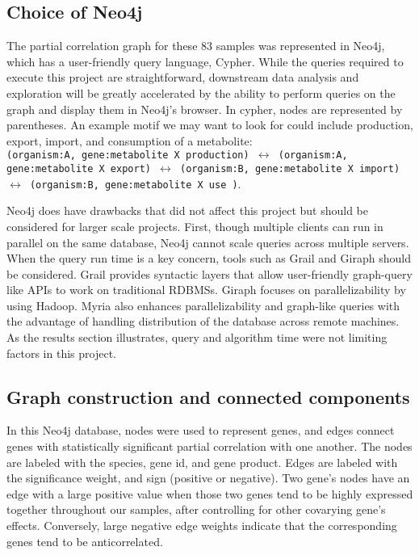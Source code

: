 \documentclass[12pt]{article}
\begin{document}
\subsection{Choice of Neo4j}

The partial correlation graph for these 83 samples was represented in Neo4j, which has a user-friendly query language, Cypher. %
While the queries required to execute this project are straightforward, downstream data analysis and exploration will be greatly accelerated by the ability to perform queries on the graph and display them in Neo4j's browser. 
In cypher, nodes are represented by parentheses.  
An example motif we may want to look for could include production, export, import, and consumption of a metabolite: \hfill \\
\texttt{(organism:A, gene:metabolite X production) $\leftrightarrow$ (organism:A, gene:metabolite X export) $\leftrightarrow$ (organism:B, gene:metabolite X import) $\leftrightarrow$ (organism:B, gene:metabolite X use )}.  

Neo4j does have drawbacks that did not affect this project but should be considered for larger scale projects.
First, though multiple clients can run in parallel on the same database, Neo4j cannot scale queries across multiple servers.  
When the query run time is a key concern, tools such as Grail and Giraph \cite{fan2015case} should be considered. 
Grail provides syntactic layers that allow user-friendly graph-query like APIs to work on traditional RDBMSs.
Giraph focuses on parallelizability by using Hadoop. 
Myria also enhances parallelizability and graph-like queries with the advantage of handling distribution of the database across remote machines. 
As the results section illustrates, query and algorithm time were not limiting factors in this project. 

\subsection{Graph construction and connected components}

In this Neo4j database, nodes were used to represent genes, and edges connect genes with statistically significant partial correlation with one another. 
The nodes are labeled with the species, gene id, and gene product.
Edges are labeled with the significance weight, and sign (positive or negative). 
Two gene's nodes have an edge with a large positive value when those two genes tend to be highly expressed together throughout our samples, after controlling for other covarying gene's effects. 
Conversely, large negative edge weights indicate that the corresponding genes tend to be anticorrelated. 
\end{document}
